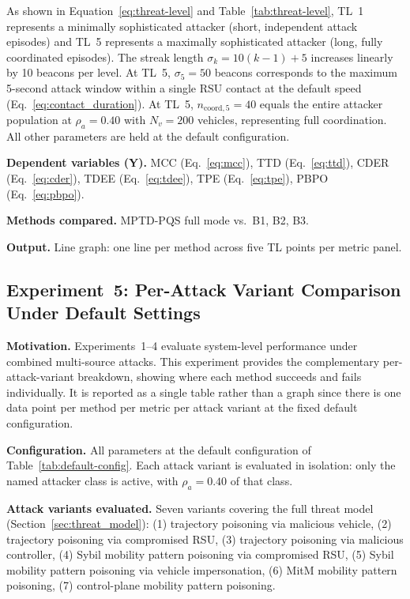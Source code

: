 \documentclass[12pt, a4paper]{report}
\begin{document}
As shown in Equation~\ref{eq:threat-level} and
Table~\ref{tab:threat-level}, TL~1 represents a minimally
sophisticated attacker (short, independent attack episodes) and
TL~5 represents a maximally sophisticated attacker (long,
fully coordinated episodes). The streak length $\sigma_k =
10(k-1)+5$ increases linearly by 10 beacons per level.
At TL~5, $\sigma_5 = 50$ beacons corresponds to the maximum
5-second attack window within a single RSU contact at the
default speed (Eq.~\ref{eq:contact_duration}). At TL~5,
$n_{\mathrm{coord},5} = 40$ equals the entire attacker
population at $\rho_a = 0.40$ with $N_v = 200$ vehicles,
representing full coordination. All other parameters are
held at the default configuration.

\textbf{Dependent variables (Y).}
MCC (Eq.~\ref{eq:mcc}),
TTD (Eq.~\ref{eq:ttd}),
CDER (Eq.~\ref{eq:cder}),
TDEE (Eq.~\ref{eq:tdee}),
TPE (Eq.~\ref{eq:tpe}),
PBPO (Eq.~\ref{eq:pbpo}).

\textbf{Methods compared.}
MPTD-PQS full mode vs.\ B1, B2, B3.

\textbf{Output.}
Line graph: one line per method across five TL points per
metric panel.

\subsection{Experiment~5: Per-Attack Variant Comparison
Under Default Settings}
\label{sec:exp5}

\textbf{Motivation.}
Experiments~1--4 evaluate system-level performance under combined
multi-source attacks. This experiment provides the complementary
per-attack-variant breakdown, showing where each method succeeds
and fails individually. It is reported as a single table rather
than a graph since there is one data point per method per metric
per attack variant at the fixed default configuration.

\textbf{Configuration.}
All parameters at the default configuration of
Table~\ref{tab:default-config}. Each attack variant is evaluated
in isolation: only the named attacker class is active, with
$\rho_a = 0.40$ of that class.

\textbf{Attack variants evaluated.}
Seven variants covering the full threat model
(Section~\ref{sec:threat_model}):
(1) trajectory poisoning via malicious vehicle,
(2) trajectory poisoning via compromised RSU,
(3) trajectory poisoning via malicious controller,
(4) Sybil mobility pattern poisoning via compromised RSU,
(5) Sybil mobility pattern poisoning via vehicle impersonation,
(6) MitM mobility pattern poisoning,
(7) control-plane mobility pattern poisoning.
\end{document}
